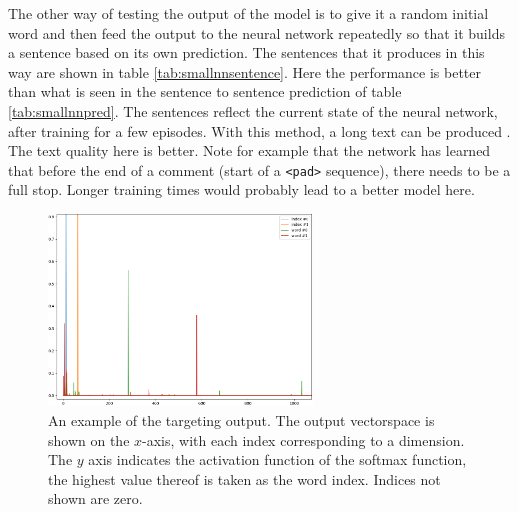 \documentclass[10pt, a4paper]{UUThesisTemplate}
\begin{document}
The other way of testing the output of the model is to give it a random initial word and then feed the output to the neural network repeatedly so that it builds a sentence based on its own prediction. The sentences that it produces in this way are shown in table \ref{tab:smallnnsentence}. Here the performance is better than what is seen in the sentence to sentence prediction of table \ref{tab:smallnnpred}. The sentences reflect the current state of the neural network, after training for a few episodes. With this method, a long text can be produced \cite{effectivernn}. The text quality here is better. Note for example that the network has learned that before the end of a comment (start of a \texttt{<pad>} sequence), there needs to be a full stop. Longer training times would probably lead to a better model here.

\begin{figure}
\includegraphics[width=7cm]{figures/softmax_target}
\caption{An example of the targeting output. The output vectorspace is shown on the $x$-axis, with each index corresponding to a dimension. The $y$ axis indicates the activation function of the softmax function, the highest value thereof is taken as the word index. Indices not shown are zero.}\label{fig:smallnnpred}
\end{figure}
\end{document}
